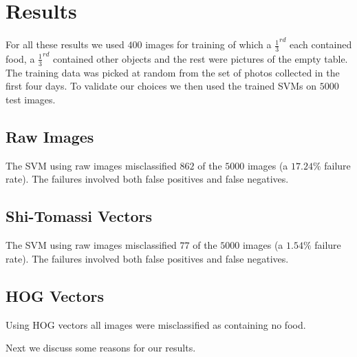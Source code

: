 \section{Results}
For all these results we used $400$ images for training of which a $\frac{1}{3}^{rd}$ each contained food, a
$\frac{1}{3}^{rd}$ contained other objects and the rest were pictures of the empty table. The training data was picked
at random from the set of photos collected in the first four days. To validate our choices we then used the trained SVMs
on $5000$ test images. 

\subsection{Raw Images}
The SVM using raw images misclassified $862$ of the $5000$ images (a $17.24\%$ failure rate). The failures involved both
false positives and false negatives.

\subsection{Shi-Tomassi Vectors}
The SVM using raw images misclassified $77$ of the $5000$ images (a $1.54\%$ failure rate). The failures involved both
false positives and false negatives.

\subsection{HOG Vectors}
Using HOG vectors all images were misclassified as containing no food. 

Next we discuss some reasons for our results.
